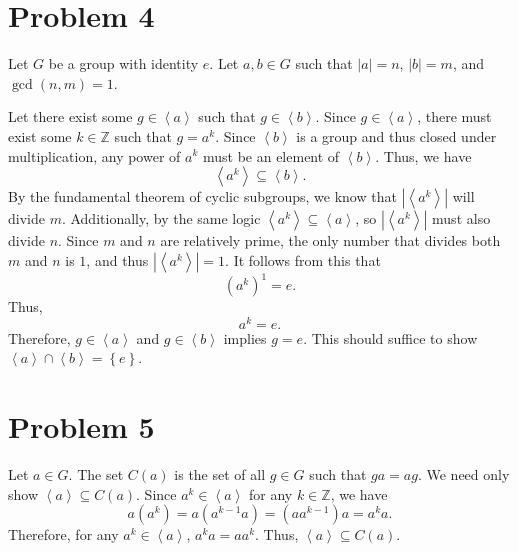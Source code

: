 \documentclass[11pt, letterpaper]{report}
\begin{document}
\section*{Problem 4}
\begin{solution}
	Let $G$ be a group with identity $e$. Let $a,b\in G$ such that $\left| a \right| =n$, $\left| b \right| =m$, and $\operatorname{gcd}(n,m) =1$.

	Let there exist some $g\in \left<a \right>$ such that $g\in \left<b \right>$. Since $g\in \left<a \right>$, there must exist some $k\in\mathbb{Z}$ such that $g=a^k$. Since $\left<b \right>$ is a group and thus closed under multiplication, any power of $a^k$ must be an element of $\left<b \right>$. Thus, we have
	\[
		\left<a^k \right>\subseteq \left<b \right>
	.\]
	By the fundamental theorem of cyclic subgroups, we know that $\left| \left<a^k \right> \right| $ will divide $m$. Additionally, by the same logic $\left<a^k \right>\subseteq \left<a \right>$, so $\left| \left<a^k \right> \right| $ must also divide $n$. Since $m$ and $n$ are relatively prime, the only number that divides both $m$ and $n$ is $1$, and thus $\left| \left<a^k \right> \right| =1$. It follows from this that
	\[
		\left( a^k \right) ^1=e
	.\]
	Thus,
	\[
		a^k=e
	.\]
	Therefore, $g\in \left<a \right>$ and $g\in \left<b \right>$ implies $g=e$. This should suffice to show $\left<a \right>\cap \left<b \right> = \left\{ e \right\} $.
\end{solution}
\section*{Problem 5}
\begin{solution}
	Let $a\in G$. The set $C(a)$ is the set of all $g\in G$ such that $ga=ag$. We need only show $\left<a \right>\subseteq C(a)$. Since $a^k\in \left<a \right>$ for any $k\in\mathbb{Z}$, we have
	\[
		a\left( a^k \right) =a\left( a^{k-1}a \right) =\left( aa^{k-1} \right) a=a^{k}a
	.\]
	Therefore, for any $a^k\in \left<a \right>$, $a^ka=aa^k$. Thus, $\left<a \right>\subseteq C(a)$.
\end{solution}
\end{document}
